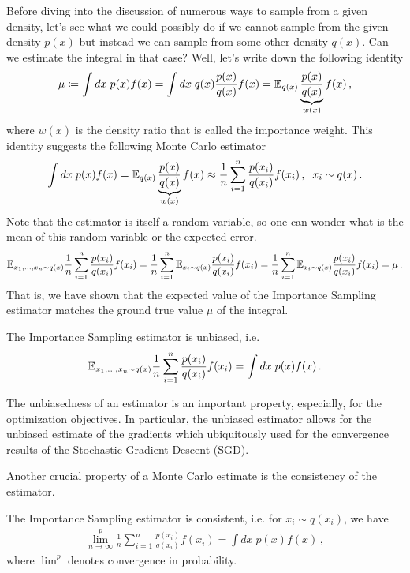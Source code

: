 Before diving into the discussion of numerous ways to sample from a given density, let's see what we could possibly do if we cannot sample from the given density $p(x)$ but instead we can sample from some other density $q(x)$.
Can we estimate the integral in that case?
Well, let's write down the following identity
\begin{align}
    \mu \coloneqq \int dx\; p(x)f(x) = \int dx\; q(x)\frac{p(x)}{q(x)}f(x) = \mathbb{E}_{q(x)}\underbrace{\frac{p(x)}{q(x)}}_{w(x)}f(x)\,,
\end{align}
where $w(x)$ is the density ratio that is called the importance weight.
This identity suggests the following Monte Carlo estimator
\begin{align}
    \int dx\; p(x)f(x) = \mathbb{E}_{q(x)}\underbrace{\frac{p(x)}{q(x)}}_{w(x)}f(x) \approx \frac{1}{n}\sum_{i=1}^n\frac{p(x_i)}{q(x_i)}f(x_i)\,, \;\; x_i \sim q(x)\,.
    \label{eq:is_estimator}
\end{align}
Note that the estimator is itself a random variable, so one can wonder what is the mean of this random variable or the expected error.
\begin{align}
    \mathbb{E}_{x_1,\ldots,x_n \sim q(x)}\frac{1}{n}\sum_{i=1}^n\frac{p(x_i)}{q(x_i)}f(x_i) = \frac{1}{n}\sum_{i=1}^n\mathbb{E}_{x_i \sim q(x)}\frac{p(x_i)}{q(x_i)}f(x_i) = \frac{1}{n}\sum_{i=1}^n\mathbb{E}_{x_i \sim q(x)}\frac{p(x_i)}{q(x_i)}f(x_i) = \mu\,.
\end{align}
That is, we have shown that the expected value of the Importance Sampling estimator matches the ground true value $\mu$ of the integral.
\begin{proposition}
    The Importance Sampling estimator is unbiased, i.e.
    \begin{align}
        \mathbb{E}_{x_1,\ldots,x_n \sim q(x)}\frac{1}{n}\sum_{i=1}^n\frac{p(x_i)}{q(x_i)}f(x_i) = \int dx\; p(x)f(x)\,.
    \end{align}
\end{proposition}
The unbiasedness of an estimator is an important property, especially, for the optimization objectives. In particular, the unbiased estimator allows for the unbiased estimate of the gradients which ubiquitously used for the convergence results of the Stochastic Gradient Descent (SGD).

Another crucial property of a Monte Carlo estimate is the consistency of the estimator.

\begin{proposition}
    The Importance Sampling estimator is consistent, i.e. for $x_i \sim q(x_i)$, we have
    \begin{align}
        \lim^p_{n\to \infty}\frac{1}{n}\sum_{i=1}^n\frac{p(x_i)}{q(x_i)}f(x_i) = \int dx\; p(x)f(x)\,,
    \end{align}
    where $\lim^p$ denotes convergence in probability.
\end{proposition}

